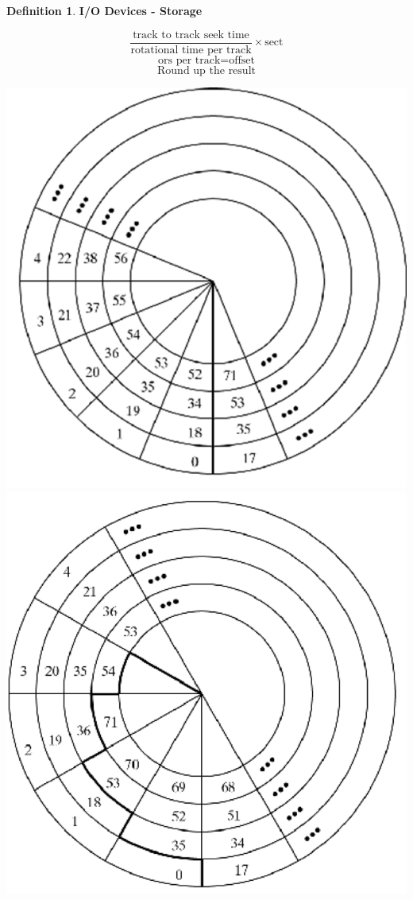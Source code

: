 \documentclass[11pt,a4paper]{article}
\theoremstyle{definition}
\newtheorem{definition}{Definition}[section]
\begin{document}
\begin{definition}{\textbf{I/O Devices - Storage}}
\begin{minipage}{0.3\linewidth}
		\[\frac{\text{track to track seek time}}{\text{rotational time per track}} \times \text{sect} \]
		\[\text{ors per track} = \text{offset}\]
		\[\text{Round up the result} \]
	\end{minipage}
	\begin{minipage}{0.7\linewidth}
		\includegraphics[width=0.5\linewidth]{m3/diskTrackView3}
		\includegraphics[width=0.5\linewidth]{m3/diskTrackView4}
	\end{minipage}
	

\end{definition}
\end{document}

